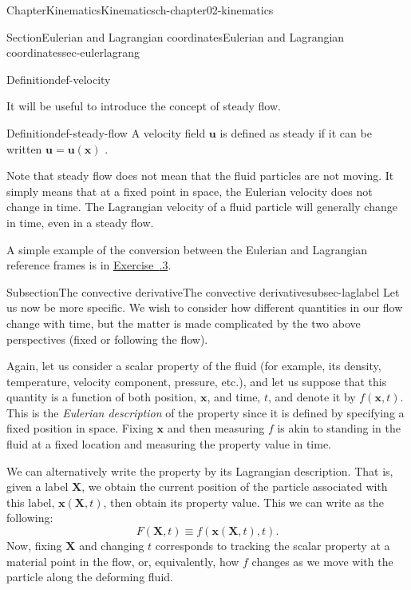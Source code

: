 \documentclass[oneside,10pt,]{book}
\newcommand{\xreffont}{\relax}
\numberwithin{equation}{section}
\newcommand{\bx}{\boldsymbol{x}}
\newcommand{\bX}{\boldsymbol{X}}
\newcommand{\bu}{\boldsymbol{u}}
\begin{document}
\begin{chapterptx}{Chapter}{Kinematics}{}{Kinematics}{}{}{ch-chapter02-kinematics}
\begin{sectionptx}{Section}{Eulerian and Lagrangian coordinates}{}{Eulerian and Lagrangian coordinates}{}{}{sec-eulerlagrang}
\begin{introduction}{}
\begin{definition}{Definition}{}{}{def-velocity}
\end{definition}
It will be useful to introduce the concept of steady flow.%
\begin{definition}{Definition}{}{}{def-steady-flow}%
A velocity field \(\bu\) is defined as steady if it can be written \(\bu=\bu(\bx)\) .%
\end{definition}
Note that steady flow does not mean that the fluid particles are not moving. It simply means that at a fixed point in space, the Eulerian velocity does not change in time. The Lagrangian velocity of a fluid particle will generally change in time, even in a steady flow.%
\par
A simple example of the conversion between the Eulerian and Lagrangian reference frames is in \hyperlink{ex-eulerian-lagrangian}{Exercise~{\xreffont 2.3.3}}.%
\end{introduction}%
%
%
\typeout{************************************************}
\typeout{************************************************}
%
\begin{subsectionptx}{Subsection}{The convective derivative}{}{The convective derivative}{}{}{subsec-laglabel}
Let us now be more specific. We wish to consider how different quantities in our flow change with time, but the matter is made complicated by the two above perspectives (fixed or following the flow).%
\par
Again, let us consider a scalar property of the fluid (for example, its density, temperature, velocity component, pressure, etc.), and let us suppose that this quantity is a function of both position, \(\bx\), and time, \(t\), and denote it by \(f(\bx, t)\). This is the \emph{Eulerian description} of the property since it is defined by specifying a fixed position in space. Fixing \(\bx\) and then measuring \(f\) is akin to standing in the fluid at a fixed location and measuring the property value in time.%
\par
We can alternatively write the property by its Lagrangian description. That is, given a label \(\bX\), we obtain the current position of the particle associated with this label, \(\bx(\bX,
t)\), then obtain its property value. This we can write as the following:%
\begin{equation*}
F(\bX, t) \equiv f(\bx(\bX, t), t).
\end{equation*}
Now, fixing \(\bX\) and changing \(t\) corresponds to tracking the scalar property at a material point in the flow, or, equivalently, how \(f\) changes as we move with the particle along the deforming fluid.%

\end{subsectionptx}
\end{sectionptx}
\end{chapterptx}
\end{document}
